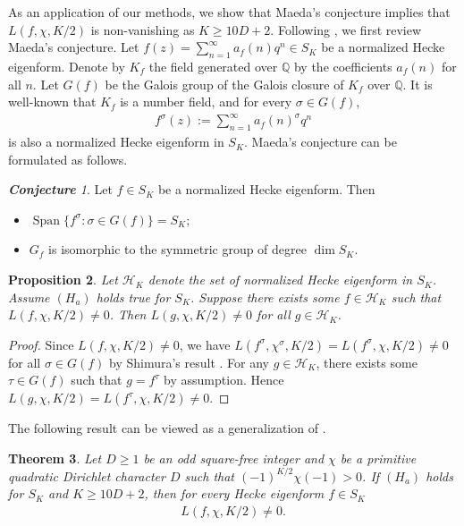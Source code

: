 \documentclass[11pt,letterpaper,reqno]{amsart}
\numberwithin{figure}{section}
\numberwithin{table}{section}
\theoremstyle{definition}
\theoremstyle{plain}
\newtheorem{theorem}{Theorem}[section]
\newtheorem{proposition}[theorem]{Proposition}
\theoremstyle{definition}
\theoremstyle{definition}
\theoremstyle{remark}
\newtheorem{conjecture}[theorem]{\bf Conjecture}
\numberwithin{equation}{section}
\theoremstyle{remark}
\DeclareMathOperator{\Span}{Span}
\begin{document}
As an application of our methods, we show that Maeda's conjecture implies that $L(f,\chi,K/2)$ is non-vanishing as $K\geq10D+2$. Following \cite{Maeda'sconjecture}, we first review  Maeda's conjecture. Let $f(z)=\sum_{n=1}^{\infty}a_f(n)q^n\in S_K$ be a normalized Hecke eigenform. Denote by $K_f$  the field generated over $\mathbb{Q}$ by the coefficients $a_f(n)$ for all $n$. Let $G(f)$ be the Galois group of the Galois closure of $K_f$ over $\mathbb{Q}$. It is well-known that $K_f$ is a number field, and for every $\sigma\in G(f)$, 
\begin{align*}
    f^{\sigma}(z):=\sum_{n=1}^{\infty}a_{f}(n)^{\sigma}q^n
\end{align*}
is also a normalized Hecke eigenform in $S_K$. Maeda's conjecture can be formulated as follows.
\begin{conjecture}\cite[p.~306]{Maeda'sconjecture}
    Let $f\in S_K$ be a normalized Hecke eigenform. Then
    \begin{itemize}
        \item[($H_a$)] $\Span\{f^{\sigma}:\sigma\in G(f)\}=S_K$;
        \item[($H_b$)] $G_f$ is isomorphic to the symmetric group of degree $\dim S_K$.
    \end{itemize}
\end{conjecture}
\begin{proposition}\label{prop:reductionbyshimuraresult}
  Let $\mathcal{H}_K$ denote the set of normalized Hecke eigenform in $S_K$. Assume $(H_a)$ holds true for $S_K$.  Suppose there exists some $f\in \mathcal{H}_K$ such that $L(f,\chi,K/2)\neq0$. Then $L(g,\chi,K/2)\neq0$ for all $g\in\mathcal{H}_K$. 
\end{proposition}
\begin{proof}
    Since $L(f,\chi,K/2)\neq0$, we have $L(f^{\sigma},\chi^{\sigma},K/2)=L(f^{\sigma},\chi,K/2)\neq0$ for all $\sigma\in G(f)$ by
     Shimura's result \cite[Theorem 1]{Shimura1976}.  For any $g\in\mathcal{H}_K$, there exists some $\tau\in G(f)$ such that $g=f^{\tau}$ by assumption. Hence $L(g,\chi,K/2)=L(f^{\tau},\chi,K/2)\neq0$.
\end{proof}
The following result can be viewed as a generalization of \cite[Theorem 1]{ConreyFarmernonvanshing}.
\begin{theorem}
    Let $D\geq1$ be an odd square-free integer and $\chi$ be a primitive quadratic Dirichlet character $D$ such that $(-1)^{K/2}\chi(-1)>0$. If $(H_a)$ holds for $S_K$ and $K\geq 10D+2$, then for every Hecke eigenform $f\in S_K$
    \begin{align*}
        L(f,\chi,K/2)\neq 0.
    \end{align*}
\end{theorem}
\end{document}
